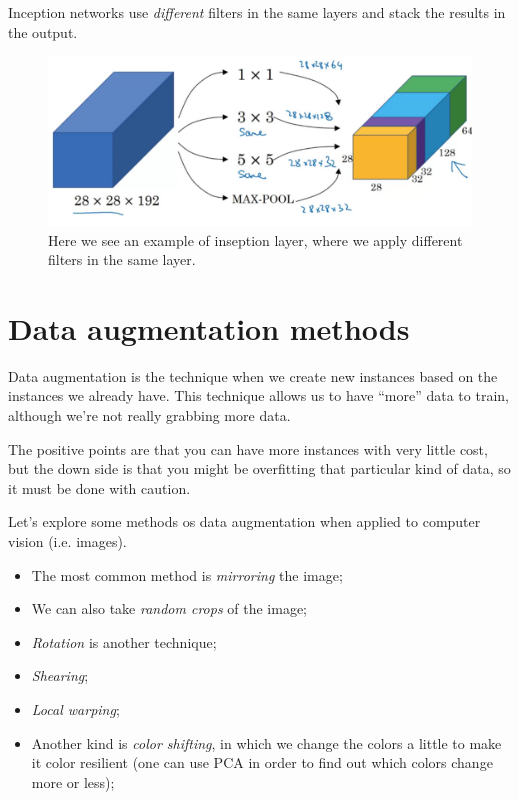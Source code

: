 \documentclass[12pt, a4paper, oneside]{book}
\begin{document}
\jump

Inception networks use \textit{different} filters in the same layers and stack
the results in the output.

\begin{figure}[h]
\centering
\includegraphics[scale=0.4]{Res/inseption-layer.png}
\caption{Here we see an example of inseption layer, where we apply different
filters in the same layer.}
\label{inseption-layer.png}
\end{figure}

\section{Data augmentation methods}%
\label{sec:data_augmentation_methods}

Data augmentation is the technique when we create new instances based on the
instances we already have. This technique allows us to have ``more'' data to
train, although we're not really grabbing more data.

The positive points are that you can have more instances with very little cost,
but the down side is that you might be overfitting that particular kind of data,
so it must be done with caution.

Let's explore some methods os data augmentation when applied to computer vision
(i.e. images).

\begin{itemize}
    \item The most common method is \textit{mirroring} the image;
    \item We can also take \textit{random crops} of the image;
    \item \textit{Rotation} is another technique;
    \item \textit{Shearing};
    \item \textit{Local warping};
    \item Another kind is \textit{color shifting}, in which we change the colors
        a little to make it color resilient (one can use PCA in order to find
        out which colors change more or less);
\end{itemize}
\end{document}
